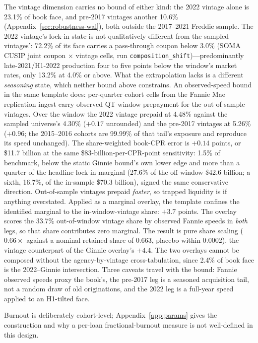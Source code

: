 \documentclass[12pt]{article}
\begin{document}
The vintage dimension carries no bound of either kind: the 2022 vintage alone is 23.1\% of book face, and pre-2017 vintages another 10.6\% (Appendix~\ref{sec:robustness-wal}), both outside the 2017--2021 Freddie sample. The 2022 vintage's lock-in state is not qualitatively different from the sampled vintages': 72.2\% of its face carries a pass-through coupon below 3.0\% (SOMA CUSIP joint coupon $\times$ vintage cells, run \texttt{composition\_shift})---predominantly late-2021/H1-2022 production four to five points below the window's market rates, only 13.2\% at 4.0\% or above. What the extrapolation lacks is a different \emph{seasoning} state, which neither bound above constrains. An observed-speed bound in the same template does: per-quarter cohort cells from the Fannie Mae replication ingest carry observed QT-window prepayment for the out-of-sample vintages. Over the window the 2022 vintage prepaid at 4.48\% against the sampled universe's 4.30\% ($+0.17$ unrounded) and the pre-2017 vintages at 5.26\% ($+0.96$; the 2015--2016 cohorts are 99.99\% of that tail's exposure and reproduce its speed unchanged). The share-weighted book-CPR error is $+0.14$ points, or \$11.7 billion at the same \$83-billion-per-CPR-point sensitivity: 1.5\% of benchmark, below the static Ginnie bound's own lower edge and more than a quarter of the headline lock-in marginal (27.6\% of the off-window \$42.6 billion; a sixth, 16.7\%, of the in-sample \$70.3 billion), signed the same conservative direction. Out-of-sample vintages prepaid \emph{faster}, so trapped liquidity is if anything overstated. Applied as a marginal overlay, the template confines the identified marginal to the in-window-vintage share: $+3.7$ points. The overlay scores the 33.7\% out-of-window vintage share by observed Fannie speeds in \emph{both} legs, so that share contributes zero marginal. The result is pure share scaling ($0.66\times$ against a nominal retained share of $0.663$, placebo within $0.0002$), the vintage counterpart of the Ginnie overlay's $+4.4$. The two overlays cannot be composed without the agency-by-vintage cross-tabulation, since 2.4\% of book face is the 2022--Ginnie intersection. Three caveats travel with the bound: Fannie observed speeds proxy the book's, the pre-2017 leg is a seasoned acquisition tail, not a random draw of old originations, and the 2022 leg is a full-year speed applied to an H1-tilted face.

Burnout is deliberately cohort-level; Appendix~\ref{app:params} gives the construction and why a per-loan fractional-burnout measure is not well-defined in this design.
\end{document}
